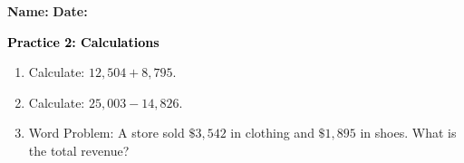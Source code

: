 \documentclass[12pt, letterpaper, fleqn]{article}
\begin{document}
\textbf{Name:} \underline{\hspace{5cm}}
\hfill
\textbf{Date:} \underline{\hspace{3cm}}\\

\begin{tcolorbox}[colback=customteal!20]
    \large\textcolor{black}{\textbf{Practice 2: Calculations}}
\end{tcolorbox}
\begin{enumerate}[itemsep=3.5cm, leftmargin=0.6cm]
\item Calculate: $12,504 + 8,795$.
\vspace{3cm}
\item Calculate: $25,003 - 14,826$.
\vspace{3cm}
\item Word Problem: A store sold $\$3,542$ in clothing and $\$1,895$ in shoes. What is the total revenue?
\end{enumerate}
\end{document}
